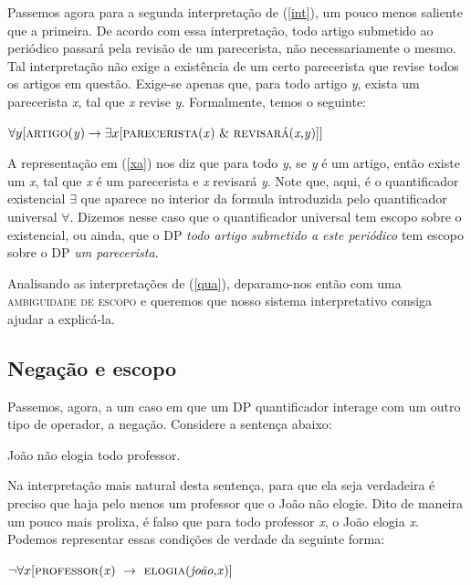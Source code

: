 Passemos agora para a segunda interpretação de (\ref{int}), um
pouco menos saliente que a primeira. De acordo com essa interpretação, todo artigo submetido ao periódico passará pela revisão de um parecerista, não necessariamente o mesmo. Tal interpretação não exige a existência de um certo parecerista que revise todos os artigos em questão. Exige-se apenas que, para todo artigo \textit{y}, exista um parecerista \textit{x}, tal que \textit{x} revise \textit{y}. Formalmente, temos o seguinte:

\begin{exe}
   \ex $\forall y [\predica{artigo}{y} \rightarrow \exists x [\predica{parecerista}{x}\ \&\ 
        \predica{revisará}{x,y}]]$
     \label{xa}
\end{exe}

\n A representação em (\ref{xa}) nos diz que para todo \textit{y}, se \textit{y} é um artigo, então existe um \textit{x}, tal que \textit{x} é um parecerista e \textit{x} revisará \textit{y}. Note
que, aqui, é o quantificador existencial $\exists$ que
aparece no interior da formula introduzida pelo quantificador
universal $\forall$. Dizemos nesse caso que o quantificador universal tem escopo sobre o existencial, ou ainda, que o DP
\textit{todo artigo submetido a este periódico} tem escopo sobre o DP
\textit{um parecerista}.

Analisando as interpretações de (\ref{qua}), deparamo-nos então
com uma \textsc{ambiguidade de escopo} e queremos que nosso sistema interpretativo consiga ajudar a explicá-la.

\subsection{Negação e escopo}

Passemos, agora, a um caso em que um DP quantificador interage com um outro tipo de operador, a negação. Considere a sentença abaixo:

\begin{exe}
    \ex João não elogia todo professor. \label{elo}
\end{exe}

\n Na interpretação mais natural desta sentença, para que ela seja
verdadeira é preciso que haja pelo menos um professor que o João
não elogie. Dito de maneira um pouco mais prolixa, é falso que para todo professor \textit{x}, o João elogia
\textit{x}. Podemos representar essas condições de verdade da
seguinte forma:

\begin{exe}
    \ex $\neg\forall x [\predica{professor}{x}\ \rightarrow\ \predica{elogia}{joão,x}]$ \label{wq}
\end{exe}

